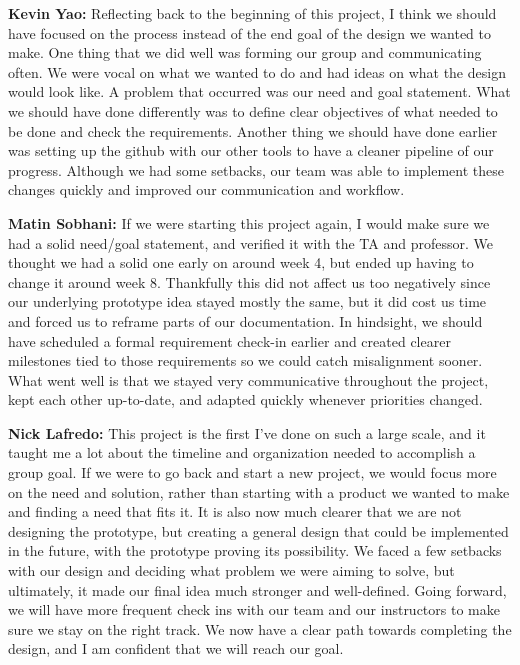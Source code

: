 \documentclass[journal, onecolumn]{IEEEtran}
\begin{document}
\textbf{Kevin Yao:} Reflecting back to the beginning of this project, I think we should have focused on the process instead of the end goal of the design we wanted to make. One thing that we did well was forming our group and communicating often. We were vocal on what we wanted to do and had ideas on what the design would look like. A problem that occurred was our need and goal statement. What we should have done differently was to define clear objectives of what needed to be done and check the requirements. Another thing we should have done earlier was setting up the github with our other tools to have a cleaner pipeline of our progress. Although we had some setbacks, our team was able to implement these changes quickly and improved our communication and workflow.

\vspace{1em}

\textbf{Matin Sobhani:} If we were starting this project again, I would make sure we had a solid need/goal statement, and verified it with the TA and professor. We thought we had a solid one early on around week 4, but ended up having to change it around week 8. Thankfully this did not affect us too negatively since our underlying prototype idea stayed mostly the same, but it did cost us time and forced us to reframe parts of our documentation. In hindsight, we should have scheduled a formal requirement check-in earlier and created clearer milestones tied to those requirements so we could catch misalignment sooner. What went well is that we stayed very communicative throughout the project, kept each other up-to-date, and adapted quickly whenever priorities changed.

\vspace{1em}

\textbf{Nick Lafredo:} This project is the first I've done on such a large scale, and it taught me a lot about the timeline and organization needed to accomplish a group goal. If we were to go back and start a new project, we would focus more on the need and solution, rather than starting with a product we wanted to make and finding a need that fits it. It is also now much clearer that we are not designing the prototype, but creating a general design that could be implemented in the future, with the prototype proving its possibility. We faced a few setbacks with our design and deciding what problem we were aiming to solve, but ultimately, it made our final idea much stronger and well-defined. Going forward, we will have more frequent check ins with our team and our instructors to make sure we stay on the right track. We now have a clear path towards completing the design, and I am confident that we will reach our goal.
\end{document}
